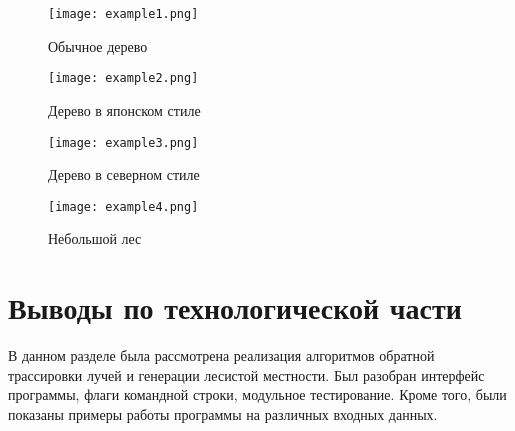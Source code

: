 \noindent
\begin{figure}[h!]
	\centering
    \texttt{[image: example1.png]}
    \caption{Обычное дерево}
    \label{img:example1}
\end{figure}

\noindent
\begin{figure}[h!]
	\centering
    \texttt{[image: example2.png]}
    \caption{Дерево в японском стиле}
    \label{img:example2}
\end{figure}

\newpage 

\noindent
\begin{figure}[h!]
	\centering
    \texttt{[image: example3.png]}
    \caption{Дерево в северном стиле}
    \label{img:example3}
\end{figure}

\noindent
\begin{figure}[h!]
	\centering
    \texttt{[image: example4.png]}
    \caption{Небольшой лес}
    \label{img:example4}
\end{figure}

\newpage 

\section{Выводы по технологической части}
В данном разделе была рассмотрена реализация алгоритмов обратной трассировки лучей и генерации лесистой местности. Был разобран интерфейс программы, флаги командной строки, модульное тестирование. Кроме того, были показаны примеры работы программы на различных входных данных.

\newpage